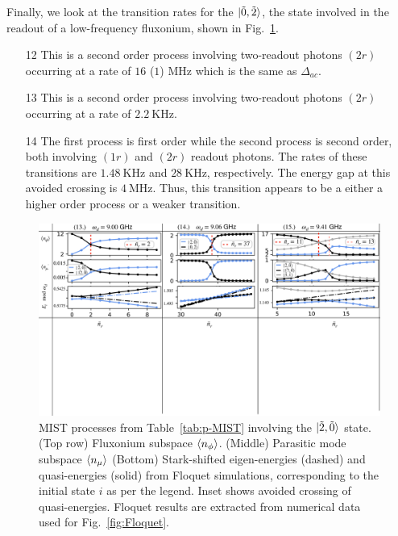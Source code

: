 \documentclass[%
reprint,
superscriptaddress,
 amsmath,amssymb,
 aps,
 prx,
longbibliography,
floatfix,
]{revtex4-2}
\begin{document}
Finally, we look at the transition rates for the $\ket{\tilde{0},\tilde{2}}$, the state involved in the readout of a low-frequency fluxonium, shown in Fig.~\ref{fig:Trans2}.
\begin{itemize}
    \item[12] This is a second order process involving two-readout photons $(2r)$ occurring at a rate of $16$ ($1$) MHz which is the same as $\Delta_{ac}$.
    \item[13] This is a second order process involving two-readout photons $(2r)$ occurring at a rate of $2.2 \ \mathrm{KHz}$.
    \item[14] The first process is first order while the second process is second order, both involving $(1r)$ and $(2r)$ readout photons. The rates of these transitions are $1.48 \ \mathrm{KHz}$ and $28 \ \mathrm{KHz}$, respectively. The energy gap at this avoided crossing is $4 \ \mathrm{MHz}$. Thus, this transition appears to be a either a higher order process or a weaker transition.
\end{itemize}
\begin{figure}
    \centering
    \includegraphics[width=1.0\textwidth]{Figures/Trans2.pdf}
    \caption{MIST processes from Table~\ref{tab:p-MIST} involving the $\ket{\tilde{2},\tilde{0}}$ state. (Top row) Fluxonium subspace $\braket{n_\phi}$. (Middle) Parasitic mode subspace $\braket{n_\mu}$ (Bottom) Stark-shifted eigen-energies (dashed) and quasi-energies (solid) from Floquet simulations, corresponding to the initial state $i$ as per the legend. Inset shows avoided crossing of quasi-energies. Floquet results are extracted from numerical data used for Fig.~\ref{fig:Floquet}.}
    \label{fig:Trans2}
\end{figure}
\end{document}
